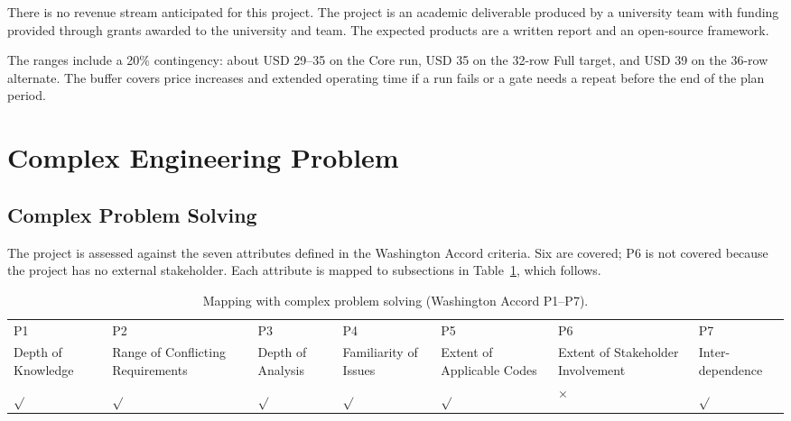 There is no revenue stream anticipated for this project. The project is an academic deliverable produced by a university team with funding provided through grants awarded to the university and team. The expected products are a written report and an open-source framework.

The ranges include a 20\% contingency: about USD 29--35 on the Core run, USD 35 on the 32-row Full target, and USD 39 on the 36-row alternate. The buffer covers price increases and extended operating time if a run fails or a gate needs a repeat before the end of the plan period.


\section{Complex Engineering Problem}

\subsection{Complex Problem Solving}

The project is assessed against the seven attributes defined in the Washington Accord criteria. Six are covered; P6 is not covered because the project has no external stakeholder. Each attribute is mapped to subsections in Table~\ref{tab:p_solve}, which follows.

\begin{center}
    \begin{table}[ht]
        \centering
        \caption{Mapping with complex problem solving (Washington Accord P1--P7).}
        \renewcommand{\arraystretch}{1.4}
        \scriptsize
        \begin{tabular}{|p{}|p{}|p{}|p{}|p{}|p{}|p{}|}
            \hline
            P1                 & P2                                & P3                & P4                    & P5                         & P6                                & P7               \\
            Depth of Knowledge & Range of Conflicting Requirements & Depth of Analysis & Familiarity of Issues & Extent of Applicable Codes & Extent of Stakeholder Involvement & Inter-dependence \\
            \hline
            $\sqrt{}$          & $\sqrt{}$                         & $\sqrt{}$         & $\sqrt{}$             & $\sqrt{}$                  & $\times$                          & $\sqrt{}$        \\
            \hline
        \end{tabular}
        \label{tab:p_solve}
    \end{table}
\end{center}

